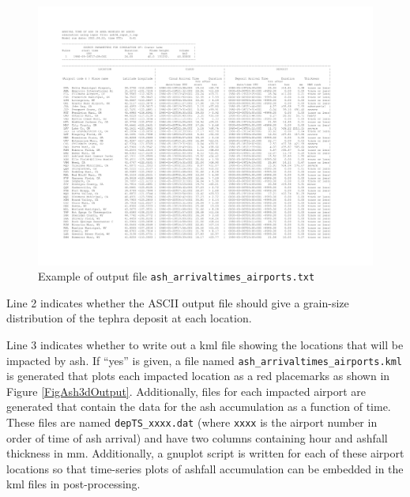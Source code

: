 \begin{figure}[htbp]\vspace*{-5cm}\hspace*{-2cm}
\includegraphics[angle=90,scale=0.9]{Figures/Chap_Usage_asharrivaltimesairports_p1.pdf}
\parbox{15cm}{\caption{\label{FigAshArrivTimeFormat}
Example of output file \texttt{ash\_arrivaltimes\_airports.txt}
}}
\end{figure}

Line 2 indicates whether the ASCII output file should give a grain-size distribution
of the tephra deposit at each location.

Line 3 indicates whether to write out a kml file showing the locations that will be
impacted by ash. If ``yes'' is given, a file named
\texttt{ash\_arrivaltimes\_airports.kml} is generated
that plots each impacted location as a red placemarks as shown in
Figure \ref{FigAsh3dOutput}.
Additionally, files for each impacted airport are generated that contain the data
for the ash accumulation as a function of time. These files are named
\texttt{depTS\_xxxx.dat} (where \texttt{xxxx} is the airport number in order of
time of ash arrival) and have two columns containing hour and ashfall thickness
in $\mathrm{mm}$. Additionally, a gnuplot script is written for each of these
airport locations so that time-series plots of ashfall accumulation can be embedded
in the kml files in post-processing.

